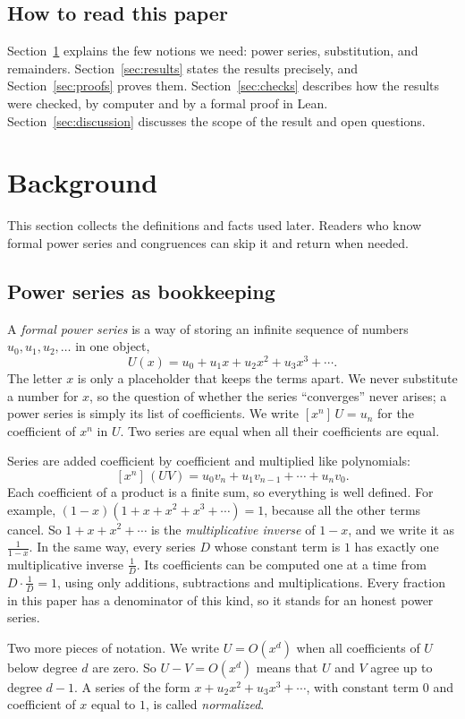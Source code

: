 \documentclass[11pt,a4paper]{article}
\theoremstyle{definition}
\theoremstyle{remark}
\newcommand{\coeff}[2]{[x^{#1}]\,#2}
\begin{document}
\subsection{How to read this paper}
Section~\ref{sec:background} explains the few notions we need: power series, substitution, and remainders. Section~\ref{sec:results}
states the results precisely, and Section~\ref{sec:proofs} proves them. Section~\ref{sec:checks} describes how the results were
checked, by computer and by a formal proof in Lean. Section~\ref{sec:discussion} discusses the scope of the result and
open questions.
\section{Background}\label{sec:background}
This section collects the definitions and facts used later. Readers who know formal power series and congruences can skip it and return when needed.
\subsection{Power series as bookkeeping}
A \emph{formal power series} is a way of storing an infinite sequence of numbers $u_0,u_1,u_2,\dots$ in one object,
\[
U(x)=u_0+u_1x+u_2x^2+u_3x^3+\cdots .
\]
The letter $x$ is only a placeholder that keeps the terms apart. We never substitute a number for $x$, so the question
of whether the series ``converges'' never arises; a power series is simply its list of coefficients. We write
$\coeff{n}{U}=u_n$ for the coefficient of $x^n$ in $U$. Two series are equal when all their coefficients are equal.

Series are added coefficient by coefficient and multiplied like polynomials:
\[
\coeff{n}{(UV)}=u_0v_n+u_1v_{n-1}+\cdots+u_nv_0 .
\]
Each coefficient of a product is a finite sum, so everything is well defined. For example,
$(1-x)(1+x+x^2+x^3+\cdots)=1$, because all the other terms cancel. So $1+x+x^2+\cdots$ is the
\emph{multiplicative inverse} of $1-x$, and we write it as $\frac{1}{1-x}$. In the same way, every series $D$ whose
constant term is $1$ has exactly one multiplicative inverse $\frac1D$. Its coefficients can be computed one at a time
from $D\cdot\frac1D=1$, using only additions, subtractions and multiplications. Every fraction in this paper has a
denominator of this kind, so it stands for an honest power series.

Two more pieces of notation. We write $U=O(x^d)$ when all coefficients of $U$ below degree $d$ are zero. So
$U-V=O(x^d)$ means that $U$ and $V$ agree up to degree $d-1$. A series of the form $x+u_2x^2+u_3x^3+\cdots$, with
constant term $0$ and coefficient of $x$ equal to $1$, is called \emph{normalized}.
\end{document}
